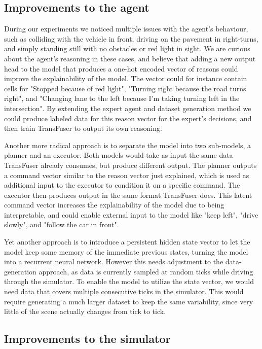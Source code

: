 \subsection{Improvements to the agent}

During our experiments we noticed multiple issues with the agent's behaviour,
such as colliding with the vehicle in front,
driving on the pavement in right-turns,
and simply standing still with no obstacles or red light in sight.
We are curious about the agent's reasoning in these cases,
and believe that adding a new output head to the model that produces a one-hot encoded vector of reasons
could improve the explainability of the model.
The vector could for instance contain cells for
"Stopped because of red light",
"Turning right because the road turns right",
and "Changing lane to the left because I'm taking turning left in the intersection".
By extending the expert agent and dataset generation method
we could produce labeled data for this reason vector for the expert's decisions,
and then train TransFuser to output its own reasoning.

Another more radical approach is to separate the model into two sub-models,
a planner and an executor.
Both models would take as input the same data TransFuser already consumes,
but produce different output.
The planner outputs a command vector similar to the reason vector just explained,
which is used as additional input to the executor to condition it on a specific command.
The executor then produces output in the same format TransFuser does.
This latent command vector increases the explainability of the model
due to being interpretable,
and could enable external input to the model like
"keep left", "drive slowly", and "follow the car in front".

Yet another approach is to introduce a persistent hidden state vector
to let the model keep some memory of the immediate previous states,
turning the model into a recurrent neural network.
However this needs adjustment to the data-generation approach,
as data is currently sampled at random ticks while driving through the simulator.
To enable the model to utilize the state vector,
we would need data that covers multiple consecutive ticks in the simulator.
This would require generating a much larger dataset to keep the same variability,
since very little of the scene actually changes from tick to tick.


\subsection{Improvements to the simulator}

